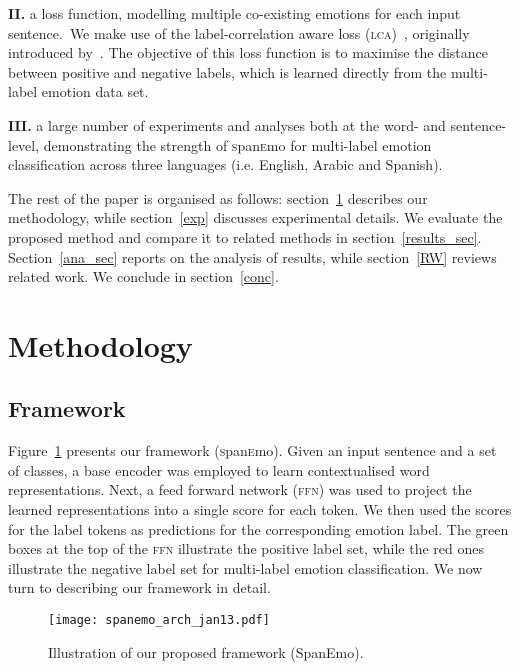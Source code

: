 \documentclass[11pt,a4paper]{article}
\begin{document}
\noindent
\textbf{II.} a loss function, modelling multiple co-existing emotions for each input sentence.~We make use of the label-correlation aware loss (\textsc{lca})~\cite{yeh2017learning}, originally introduced by~. The objective of this loss function is to maximise the distance between positive and negative labels, which is learned directly from the multi-label emotion data set. 

\noindent
\textbf{III.} a large number of experiments and analyses both at the word- and sentence-level, demonstrating the strength of \textsc{s}pan\textsc{e}mo for multi-label emotion classification across three languages (i.e. English, Arabic and Spanish).



The rest of the paper is organised as follows: section~\ref{method} describes our methodology, while section~\ref{exp} discusses experimental details. We evaluate the proposed method and compare it to related methods in section~\ref{results_sec}. Section~\ref{ana_sec} reports on the analysis of results, while section~\ref{RW} reviews related work. We conclude in section~\ref{conc}.


\section{Methodology} \label{method}
\subsection{Framework}


Figure~\ref{arch} presents our framework (\textsc{s}pan\textsc{e}mo). Given an input sentence and a set of classes, a base encoder was employed to learn contextualised word representations. Next, a feed forward network (\textsc{ffn}) was used to project the learned representations into a single score for each token. We then used the scores for the label tokens as predictions for the corresponding emotion label. The green boxes at the top of the \textsc{ffn} illustrate the positive label set, while the red ones illustrate the negative label set for multi-label emotion classification. We now turn to describing our framework in detail. 
\begin{figure}[ht]
\centering
   \texttt{[image: spanemo\_arch\_jan13.pdf]}
  \caption{Illustration of our proposed framework (SpanEmo).}\label{arch}
\end{figure}
\end{document}
